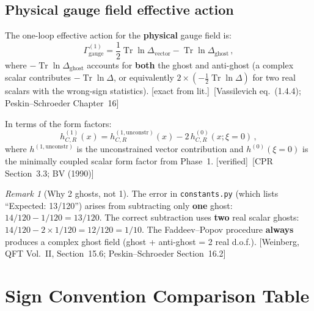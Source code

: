 \documentclass[12pt,a4paper]{article}
\theoremstyle{definition}
\theoremstyle{remark}
\newtheorem{remark}[proposition]{Remark}
\newcommand{\Tr}{\operatorname{Tr}}
\newcommand{\fromlit}[1]{\textcolor{blue!70!black}{\textsf{[#1]}}}
\newcommand{\exactlit}{\textcolor{blue!60!black}{\textsf{[exact from lit.]}}}
\newcommand{\verified}{\textcolor{green!50!black}{\textsf{[verified]}}}
\begin{document}
\subsection{Physical gauge field effective action}
\label{sec:physical-gauge}

The one-loop effective action for the \textbf{physical} gauge field is:
\begin{equation}
  \boxed{
  \Gamma^{(1)}_{\mathrm{gauge}}
  = \frac{1}{2}\Tr\ln\Delta_{\mathrm{vector}}
  - \Tr\ln\Delta_{\mathrm{ghost}}\,,
  }
  \label{eq:gauge-effective-action}
\end{equation}
where $-\Tr\ln\Delta_{\mathrm{ghost}}$ accounts for \textbf{both}
the ghost and anti-ghost (a complex scalar contributes
$-\Tr\ln\Delta$, or equivalently $2 \times (-\frac{1}{2}\Tr\ln\Delta)$
for two real scalars with the wrong-sign statistics).
\exactlit\ \fromlit{Vassilevich eq.~(1.4.4); Peskin--Schroeder
Chapter~16}

In terms of the form factors:
\begin{equation}
  \boxed{
  h_{C,R}^{(1)}(x) = h_{C,R}^{(1,\mathrm{unconstr})}(x)
  - 2\,h_{C,R}^{(0)}(x;\xi=0)\,,
  }
  \label{eq:ghost-subtraction}
\end{equation}
where $h^{(1,\mathrm{unconstr})}$ is the unconstrained vector
contribution and $h^{(0)}(\xi=0)$ is the minimally coupled scalar
form factor from Phase~1.
\verified\ \fromlit{CPR Section~3.3; BV (1990)}

\begin{remark}[Why 2 ghosts, not 1]
\label{rem:two-ghosts}
The error in \texttt{constants.py} (which lists ``Expected: 13/120'')
arises from subtracting only \textbf{one} ghost:
$14/120 - 1/120 = 13/120$.  The correct subtraction uses
\textbf{two} real scalar ghosts:
$14/120 - 2 \times 1/120 = 12/120 = 1/10$.
The Faddeev--Popov procedure \textbf{always} produces a complex
ghost field (ghost + anti-ghost = 2 real d.o.f.).
\fromlit{Weinberg, QFT Vol.~II, Section~15.6;
Peskin--Schroeder Section~16.2}
\end{remark}


\section{Sign Convention Comparison Table}
\label{sec:signs}
\end{document}
